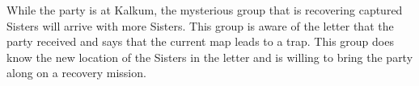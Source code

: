While the party is at Kalkum, the mysterious group that is recovering captured Sisters will arrive with more Sisters.
This group is aware of the letter that the party received and says that the current map leads to a trap.
This group does know the new location of the Sisters in the letter and is willing to bring the party along on a recovery mission.